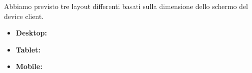 Abbiamo previsto tre layout differenti basati sulla dimensione dello schermo del device client. 
\begin{itemize}
	\item \bfseries{Desktop}: 
	\item \bfseries{Tablet}:
	\item \bfseries{Mobile}:
\end{itemize}